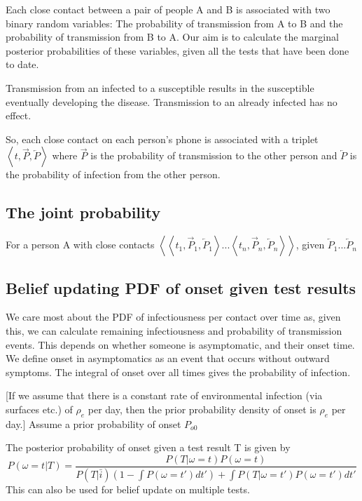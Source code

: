 \documentclass{article}
\begin{document}
Each close contact between a pair of people A and B is associated with two binary random variables: The probability of transmission from A to B and the probability of transmission from B to A. Our aim is to calculate the marginal posterior probabilities of these variables, given all the tests that have been done to date.

Transmission from an infected to a susceptible results in the susceptible eventually developing the disease. Transmission to an already infected has no effect.

So, each close contact on each person's phone is associated with a triplet $\left<t, \overrightarrow{P}, \overleftarrow{P}\right>$ where $\overrightarrow{P}$ is the probability of transmission to the other person and $\overleftarrow{P}$ is the probability of infection from the other person.

\subsection{The joint probability}

For a person A with close contacts $\left<\left<t_1, \overrightarrow{P}_1, \overleftarrow{P}_1\right>...\left<t_n, \overrightarrow{P}_n, \overleftarrow{P}_n\right>\right>$, given $\overleftarrow{P}_1...\overleftarrow{P}_n$


\subsection{Belief updating PDF of onset given test results}

We care most about the PDF of infectiousness per contact over time as, given this, we can calculate remaining infectiousness and probability of transmission events. This depends on whether someone is asymptomatic, and their onset time. We define onset in asymptomatics as an event that occurs without outward symptoms. The integral of onset over all times gives the probability of infection.

[If we assume that there is a constant rate of environmental infection (via surfaces etc.) of $\rho_e$ per day, then the prior probability density of onset is $\rho_e$ per day.]
Assume a prior probability of onset $P_{o0}$

The posterior probability of onset given a test result T is given by
\[
P(\omega = t|T) = \frac{P(T|\omega = t)P(\omega=t)}{P(T|\bar{i})(1-\int P(\omega = t')dt') + \int P(T|\omega = t')P(\omega = t') dt'}
\]
This can also be used for belief update on multiple tests.
\end{document}
